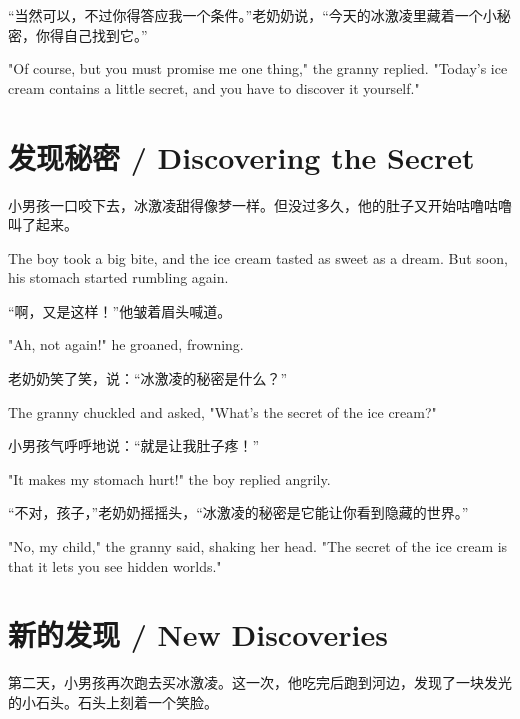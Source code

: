 “当然可以，不过你得答应我一个条件。”老奶奶说，“今天的冰激凌里藏着一个小秘密，你得自己找到它。”

\begin{flushright}
"Of course, but you must promise me one thing," the granny replied. "Today’s ice cream contains a little secret, and you have to discover it yourself."
\end{flushright}

\section*{发现秘密 / Discovering the Secret}

小男孩一口咬下去，冰激凌甜得像梦一样。但没过多久，他的肚子又开始咕噜咕噜叫了起来。

\begin{flushright}
The boy took a big bite, and the ice cream tasted as sweet as a dream. But soon, his stomach started rumbling again.
\end{flushright}

“啊，又是这样！”他皱着眉头喊道。

\begin{flushright}
"Ah, not again!" he groaned, frowning.
\end{flushright}

老奶奶笑了笑，说：“冰激凌的秘密是什么？”

\begin{flushright}
The granny chuckled and asked, "What’s the secret of the ice cream?"
\end{flushright}

小男孩气呼呼地说：“就是让我肚子疼！”

\begin{flushright}
"It makes my stomach hurt!" the boy replied angrily.
\end{flushright}

“不对，孩子，”老奶奶摇摇头，“冰激凌的秘密是它能让你看到隐藏的世界。”

\begin{flushright}
"No, my child," the granny said, shaking her head. "The secret of the ice cream is that it lets you see hidden worlds."
\end{flushright}

\section*{新的发现 / New Discoveries}

第二天，小男孩再次跑去买冰激凌。这一次，他吃完后跑到河边，发现了一块发光的小石头。石头上刻着一个笑脸。

